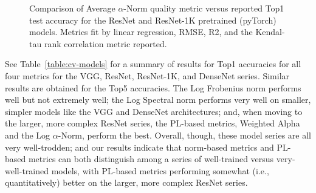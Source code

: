 \begin{figure}[t]
    \centering

    \qquad
    \caption{Comparison of Average $\alpha$-Norm quality metric versus reported Top1 test accuracy for the ResNet and ResNet-1K pretrained (pyTorch) models. 
             Metrics fit by linear regression, RMSE, R2, and the Kendal-tau rank correlation metric reported.  
            }
    \label{fig:cv2-accuracy}
\end{figure}


See Table~\ref{table:cv-models} for a summary of results for Top1 accuracies for all four metrics for the VGG, ResNet, ResNet-1K, and DenseNet series.
Similar results are obtained for the Top5 accuracies.
The Log Frobenius norm performs well but not extremely well;
the Log Spectral norm performs very well on smaller, simpler models like the VGG and DenseNet architectures; and, 
when moving to the larger, more complex ResNet series, the PL-based metrics, Weighted Alpha and the Log $\alpha$-Norm, perform the best.
Overall, though, these model series are all very well-trodden; and our results indicate that norm-based metrics and PL-based metrics can both distinguish among a series of well-trained versus very-well-trained models, with PL-based metrics performing somewhat (i.e., quantitatively) better on the larger, more complex ResNet series.


